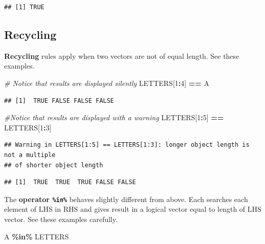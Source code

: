 \documentclass[
]{book}
\newenvironment{Shaded}{\begin{snugshade}}{\end{snugshade}}
\newcommand{\CommentTok}[1]{\textcolor[rgb]{0.56,0.35,0.01}{\textit{#1}}}
\newcommand{\DecValTok}[1]{\textcolor[rgb]{0.00,0.00,0.81}{#1}}
\newcommand{\NormalTok}[1]{#1}
\newcommand{\SpecialCharTok}[1]{\textcolor[rgb]{0.81,0.36,0.00}{\textbf{#1}}}
\newcommand{\StringTok}[1]{\textcolor[rgb]{0.31,0.60,0.02}{#1}}
\begin{document}
\begin{verbatim}
## [1] TRUE
\end{verbatim}

\hypertarget{recycling}{%
\subsection*{Recycling}\label{recycling}}

\textbf{Recycling} rules apply when two vectors are not of equal length. See these examples.

\begin{Shaded}
\begin{Highlighting}[]
\CommentTok{\# Notice that results are displayed silently}
\NormalTok{LETTERS[}\DecValTok{1}\SpecialCharTok{:}\DecValTok{4}\NormalTok{] }\SpecialCharTok{==} \StringTok{\textquotesingle{}A\textquotesingle{}}
\end{Highlighting}
\end{Shaded}

\begin{verbatim}
## [1]  TRUE FALSE FALSE FALSE
\end{verbatim}

\begin{Shaded}
\begin{Highlighting}[]
\CommentTok{\#Notice that results are displayed with a warning}
\NormalTok{LETTERS[}\DecValTok{1}\SpecialCharTok{:}\DecValTok{5}\NormalTok{] }\SpecialCharTok{==}\NormalTok{ LETTERS[}\DecValTok{1}\SpecialCharTok{:}\DecValTok{3}\NormalTok{]}
\end{Highlighting}
\end{Shaded}

\begin{verbatim}
## Warning in LETTERS[1:5] == LETTERS[1:3]: longer object length is not a multiple
## of shorter object length
\end{verbatim}

\begin{verbatim}
## [1]  TRUE  TRUE  TRUE FALSE FALSE
\end{verbatim}

The \textbf{operator \texttt{\%in\%}} behaves slightly different from above. Each searches each element of LHS in RHS and gives result in a logical vector equal to length of LHS vector. See these examples carefully.

\begin{Shaded}
\begin{Highlighting}[]
\StringTok{\textquotesingle{}A\textquotesingle{}} \SpecialCharTok{\%in\%}\NormalTok{ LETTERS}
\end{Highlighting}
\end{Shaded}
\end{document}
